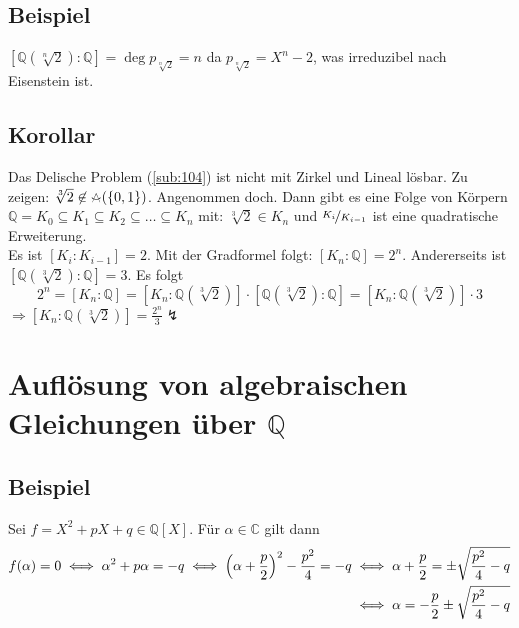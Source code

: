 \subsection[Beispiel: Begründung warum der algebraische Abschluss von $\mathds{Q}$ nicht endlich ist]{Beispiel} %
\label{sub:1133}
$[\mathds{Q}(\sqrt[n]{2}) :\mathds{Q}] = \deg p_{\sqrt[n]{2}} = n$ da $p_{\sqrt[n]{2}} = X^n -2$, was irreduzibel nach Eisenstein ist.

\subsection[Korollar: Das Delische Problem ist nicht mit Zirkel und Lineal lösbar]{Korollar} %
\label{sub:1134}
Das Delische Problem (\ref{sub:104}) ist nicht mit Zirkel und Lineal lösbar.
Zu zeigen: $\sqrt[3]{2}  \not\in \zirkel (\{0,1\})$. Angenommen doch. Dann gibt es eine Folge von Körpern $\mathds{Q}=K_0 \subseteq K_1 \subseteq K_2 \subseteq  \ldots \subseteq K_n$ mit: $\sqrt[3]{2} \in K_n  $ und $\nicefrac{K_i}{K_{i-1}}$ ist eine quadratische Erweiterung.\\
Es ist $[K_i : K_{i-1}] =2$. Mit der Gradformel folgt: $[K_n :\mathds{Q}] = 2^n$. Andererseits ist $[\mathds{Q}(\sqrt[3]{2}  ) :\mathds{Q}]=3$. Es folgt 
\[
	2^n = [K_n : \mathds{Q}] = \left[K_n : \mathds{Q}(\sqrt[3]{2}  )\right] \cdot \left[\mathds{Q}(\sqrt[3]{2}) :\mathds{Q}\right] 
	= \left[K_n : \mathds{Q}(\sqrt[3]{2}  )\right] \cdot 3
\]
$\Rightarrow [K_n : \mathds{Q}(\sqrt[3]{2}  )] = \frac{2^n}{3} \lightning$  \bewende
\newpage
\section{Auflösung von algebraischen Gleichungen über $\mathds{Q}$} %
\label{sec:12}
\subsection[Beispiel: $pq$-Formel]{Beispiel} %
\label{sub:12.1}
Sei $f= X^2 + pX+ q \in \mathds{Q}[X]$. Für $\alpha \in \mathds{C}$ gilt dann 
\begin{align*}
	f(\alpha)=0 \iff \alpha^2+ p \alpha= -q \iff \enbrace*{\alpha+ \frac{p}{2} }^2- \frac{p^2}{4} = -q &\iff \alpha+ \frac{p}{2} = \pm \sqrt{\frac{p^2}{4}-q }\\
	&\iff \alpha= - \frac{p}{2} \pm \sqrt{\frac{p^2}{4}-q }
\end{align*}

